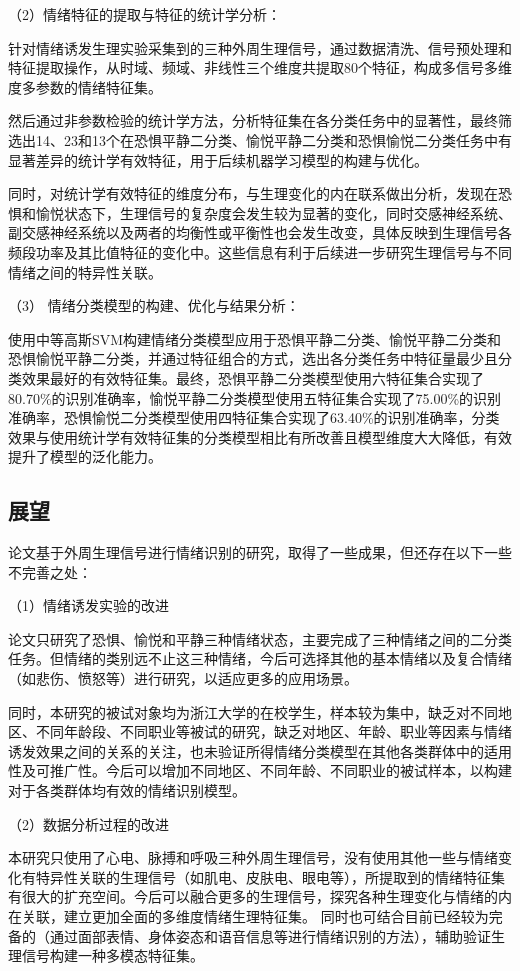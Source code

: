 （2）情绪特征的提取与特征的统计学分析： 

针对情绪诱发生理实验采集到的三种外周生理信号，通过数据清洗、信号预处理和特征提取操作，从时域、频域、非线性三个维度共提取80个特征，构成多信号多维度多参数的情绪特征集。

然后通过非参数检验的统计学方法，分析特征集在各分类任务中的显著性，最终筛选出14、23和13个在恐惧平静二分类、愉悦平静二分类和恐惧愉悦二分类任务中有显著差异的统计学有效特征，用于后续机器学习模型的构建与优化。

同时，对统计学有效特征的维度分布，与生理变化的内在联系做出分析，发现在恐惧和愉悦状态下，生理信号的复杂度会发生较为显著的变化，同时交感神经系统、副交感神经系统以及两者的均衡性或平衡性也会发生改变，具体反映到生理信号各频段功率及其比值特征的变化中。这些信息有利于后续进一步研究生理信号与不同情绪之间的特异性关联。

（3） 情绪分类模型的构建、优化与结果分析： 

使用中等高斯SVM构建情绪分类模型应用于恐惧平静二分类、愉悦平静二分类和恐惧愉悦平静二分类，并通过特征组合的方式，选出各分类任务中特征量最少且分类效果最好的有效特征集。最终，恐惧平静二分类模型使用六特征集合实现了80.70\%的识别准确率，愉悦平静二分类模型使用五特征集合实现了75.00\%的识别准确率，恐惧愉悦二分类模型使用四特征集合实现了63.40\%的识别准确率，分类效果与使用统计学有效特征集的分类模型相比有所改善且模型维度大大降低，有效提升了模型的泛化能力。


\subsection{展望}

论文基于外周生理信号进行情绪识别的研究，取得了一些成果，但还存在以下一些不完善之处：

（1）情绪诱发实验的改进

论文只研究了恐惧、愉悦和平静三种情绪状态，主要完成了三种情绪之间的二分类任务。但情绪的类别远不止这三种情绪，今后可选择其他的基本情绪以及复合情绪（如悲伤、愤怒等）进行研究，以适应更多的应用场景。

同时，本研究的被试对象均为浙江大学的在校学生，样本较为集中，缺乏对不同地区、不同年龄段、不同职业等被试的研究，缺乏对地区、年龄、职业等因素与情绪诱发效果之间的关系的关注，也未验证所得情绪分类模型在其他各类群体中的适用性及可推广性。今后可以增加不同地区、不同年龄、不同职业的被试样本，以构建对于各类群体均有效的情绪识别模型。

（2）数据分析过程的改进

本研究只使用了心电、脉搏和呼吸三种外周生理信号，没有使用其他一些与情绪变化有特异性关联的生理信号（如肌电、皮肤电、眼电等），所提取到的情绪特征集有很大的扩充空间。今后可以融合更多的生理信号，探究各种生理变化与情绪的内在关联，建立更加全面的多维度情绪生理特征集。
同时也可结合目前已经较为完备的（通过面部表情、身体姿态和语音信息等进行情绪识别的方法），辅助验证生理信号构建一种多模态特征集。

